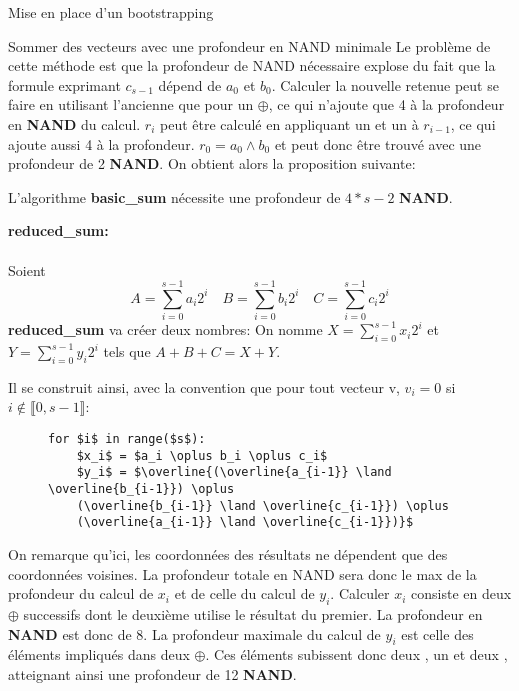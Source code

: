 \begin{section}{Mise en place d'un bootstrapping}
\begin{subsection}{Sommer des vecteurs avec une profondeur en NAND minimale}
Le problème de cette méthode est que la profondeur de NAND nécessaire explose du
fait que la formule exprimant $c_{s-1}$ dépend de $a_0$ et $b_0$. 
Calculer la nouvelle retenue peut se faire en utilisant l'ancienne que pour un $\oplus$, ce qui n'ajoute que 4 à la 	
profondeur en \textbf{NAND} du calcul. 
$r_i$ peut être calculé en appliquant un  et un  à $r_{i-1}$, ce qui ajoute aussi 4 à la profondeur. 
$r_0 = a_0 \land b_0$ et peut donc être trouvé avec une profondeur de 2 \textbf{NAND}. 
On obtient alors la proposition suivante:
\begin{prop}
	L'algorithme \textbf{basic\_sum} nécessite une profondeur de $4*s - 2$ \textbf{NAND}.
\end{prop}


\vspace{0.3cm}
\noindent
\textbf{reduced\_sum:}
\paragraph{}

Soient 
\[A = \sum_{i=0}^{s-1} a_i 2^i \quad B = \sum_{i=0}^{s-1} b_i 2^i \quad C = \sum_{i=0}^{s-1} c_i 2^i \]
\textbf{reduced\_sum} va créer deux nombres:
On nomme $X = \sum_{i=0}^{s-1} x_i 2^i$  et $Y = \sum_{i=0}^{s-1} y_i 2^i$ 
tels que $A + B + C = X + Y$.

Il se construit ainsi, avec la convention que pour tout vecteur v, $v_i = 0$ si
$i \not\in \llbracket 0, s-1 \rrbracket$:
\begin{figure}[!h]
\begin{lstlisting}
for $i$ in range($s$):
	$x_i$ = $a_i \oplus b_i \oplus c_i$
	$y_i$ = $\overline{(\overline{a_{i-1}} \land \overline{b_{i-1}}) \oplus
	(\overline{b_{i-1}} \land \overline{c_{i-1}}) \oplus
	(\overline{a_{i-1}} \land \overline{c_{i-1}})}$
\end{lstlisting}
\end{figure}

On remarque qu'ici, les coordonnées des résultats ne dépendent que des
coordonnées voisines. La profondeur totale en NAND sera donc le max de la profondeur du calcul de $x_i$ et de celle du calcul de $y_i$.
Calculer $x_i$ consiste en deux $\oplus$ successifs dont le deuxième utilise le résultat du premier. La profondeur en \textbf{NAND} est donc de 8. 
La profondeur maximale du calcul de $y_i$ est celle des éléments impliqués dans deux $\oplus$. Ces éléments subissent donc deux , un  et deux , atteignant ainsi une profondeur de 12 \textbf{NAND}.


\end{subsection}
\end{section}
